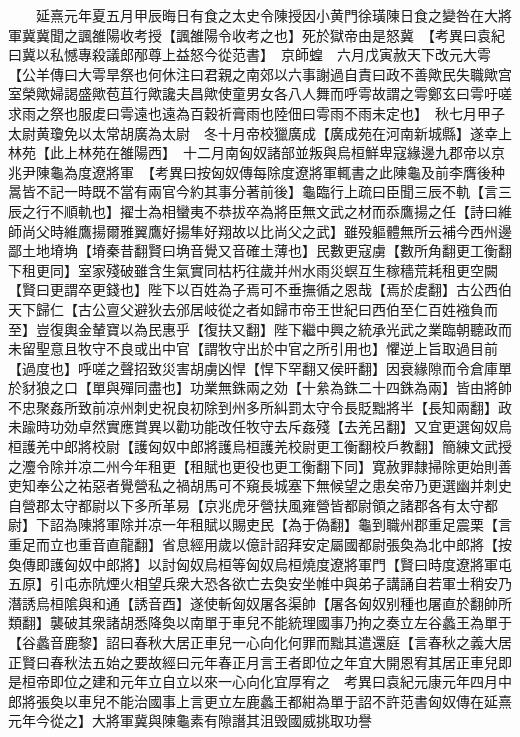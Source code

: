 　　延熹元年夏五月甲辰晦日有食之太史令陳授因小黄門徐璜陳日食之變咎在大將軍冀冀聞之諷雒陽收考授【諷雒陽令收考之也】死於獄帝由是怒冀　【考異曰袁紀曰冀以私憾專殺議郎邴尊上益怒今從范書】　京師蝗　六月戊寅赦天下改元大雩【公羊傳曰大雩旱祭也何休注曰君親之南郊以六事謝過自責曰政不善歟民失職歟宫室榮歟婦謁盛歟苞苴行歟讒夫昌歟使童男女各八人舞而呼雩故謂之雩鄭玄曰雩吁嗟求雨之祭也服䖍曰雩遠也遠為百穀祈膏雨也陸佃曰雩雨不雨未定也】　秋七月甲子太尉黄瓊免以太常胡廣為太尉　冬十月帝校獵廣成【廣成苑在河南新城縣】遂幸上林苑【此上林苑在雒陽西】　十二月南匈奴諸部並叛與烏桓鮮卑寇緣邊九郡帝以京兆尹陳龜為度遼將軍　【考異曰按匈奴傳每除度遼將軍輒書之此陳龜及前李膺後种暠皆不記一時既不當有兩官今約其事分著前後】龜臨行上疏曰臣聞三辰不軌【言三辰之行不順軌也】擢士為相蠻夷不恭拔卒為將臣無文武之材而忝鷹揚之任【詩曰維師尚父時維鷹揚爾雅翼鷹好揚隼好翔故以比尚父之武】雖殁軀體無所云補今西州邊鄙土地塉埆【塉秦昔翻賢曰埆音覺又音確土薄也】民數更寇虜【數所角翻更工衡翻下租更同】室家殘破雖含生氣實同枯朽往歲并州水雨災螟互生稼穡荒耗租更空闕【賢曰更謂卒更錢也】陛下以百姓為子焉可不垂撫循之恩哉【焉於䖍翻】古公西伯天下歸仁【古公亶父避狄去邠居岐從之者如歸市帝王世紀曰西伯至仁百姓襁負而至】豈復輿金輦寶以為民惠乎【復扶又翻】陛下繼中興之統承光武之業臨朝聽政而未留聖意且牧守不良或出中官【謂牧守出於中官之所引用也】懼逆上旨取過目前【過度也】呼嗟之聲招致災害胡虜凶悍【悍下罕翻又侯旰翻】因衰緣隙而令倉庫單於豺狼之口【單與殫同盡也】功業無銖兩之効【十絫為銖二十四銖為兩】皆由將帥不忠聚姦所致前凉州刺史祝良初除到州多所糾罰太守令長貶黜將半【長知兩翻】政未踰時功効卓然實應賞異以勸功能改任牧守去斥姦殘【去羌呂翻】又宜更選匈奴烏桓護羌中郎將校尉【護匈奴中郎將護烏桓護羌校尉更工衡翻校戶教翻】簡練文武授之灋令除并凉二州今年租更【租賦也更役也更工衡翻下同】寛赦罪隸掃除更始則善吏知奉公之祐惡者覺營私之禍胡馬可不窺長城塞下無候望之患矣帝乃更選幽并刺史自營郡太守都尉以下多所革易【京兆虎牙營扶風雍營皆都尉領之諸郡各有太守都尉】下詔為陳將軍除并凉一年租賦以賜吏民【為于偽翻】龜到職州郡重足震栗【言重足而立也重音直龍翻】省息經用歲以億計詔拜安定屬國都尉張奐為北中郎將【按奐傳即護匈奴中郎將】以討匈奴烏桓等匈奴烏桓燒度遼將軍門【賢曰時度遼將軍屯五原】引屯赤阬煙火相望兵衆大恐各欲亡去奐安坐帷中與弟子講誦自若軍士稍安乃潛誘烏桓隂與和通【誘音酉】遂使斬匈奴屠各渠帥【屠各匈奴别種也屠直於翻帥所類翻】襲破其衆諸胡悉降奐以南單于車兒不能統理國事乃拘之奏立左谷蠡王為單于【谷蠡音鹿黎】詔曰春秋大居正車兒一心向化何罪而黜其遣還庭【言春秋之義大居正賢曰春秋法五始之要故經曰元年春正月言王者即位之年宜大開恩宥其居正車兒即是桓帝即位之建和元年立自立以來一心向化宜厚宥之　考異曰袁紀元康元年四月中郎將張奐以車兒不能治國事上言更立左鹿蠡王都紺為單于詔不許范書匈奴傳在延熹元年今從之】大將軍冀與陳龜素有隙譖其沮毁國威挑取功譽

